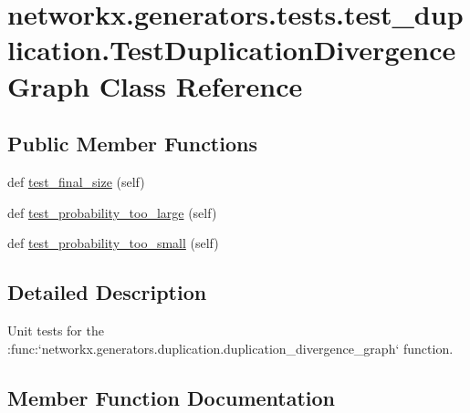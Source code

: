 \hypertarget{classnetworkx_1_1generators_1_1tests_1_1test__duplication_1_1TestDuplicationDivergenceGraph}{}\section{networkx.\+generators.\+tests.\+test\+\_\+duplication.\+Test\+Duplication\+Divergence\+Graph Class Reference}
\label{classnetworkx_1_1generators_1_1tests_1_1test__duplication_1_1TestDuplicationDivergenceGraph}
\subsection*{Public Member Functions}
\begin{DoxyCompactItemize}
\item 
def \hyperlink{classnetworkx_1_1generators_1_1tests_1_1test__duplication_1_1TestDuplicationDivergenceGraph_a0339d8c88460fbcecfbc314ef9c3dda7}{test\+\_\+final\+\_\+size} (self)
\item 
def \hyperlink{classnetworkx_1_1generators_1_1tests_1_1test__duplication_1_1TestDuplicationDivergenceGraph_a13c3eebd7e47a7c7e0ee8380e873f579}{test\+\_\+probability\+\_\+too\+\_\+large} (self)
\item 
def \hyperlink{classnetworkx_1_1generators_1_1tests_1_1test__duplication_1_1TestDuplicationDivergenceGraph_a75eee9a540ecce3a5caecc68bc8eea60}{test\+\_\+probability\+\_\+too\+\_\+small} (self)
\end{DoxyCompactItemize}


\subsection{Detailed Description}
\begin{DoxyVerb}Unit tests for the
:func:`networkx.generators.duplication.duplication_divergence_graph`
function.\end{DoxyVerb}
 

\subsection{Member Function Documentation}
\mbox{\label{classnetworkx_1_1generators_1_1tests_1_1test__duplication_1_1TestDuplicationDivergenceGraph_a0339d8c88460fbcecfbc314ef9c3dda7}} 
